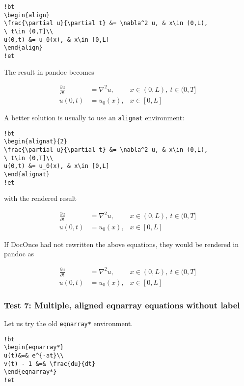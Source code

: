 \documentclass[]{article}
\begin{document}
\begin{verbatim}
!bt
\begin{align}
\frac{\partial u}{\partial t} &= \nabla^2 u, & x\in (0,L),
\ t\in (0,T]\\ 
u(0,t) &= u_0(x), & x\in [0,L]
\end{align}
!et
\end{verbatim}

The result in pandoc becomes

\[
\begin{align}
\frac{\partial u}{\partial t} &= \nabla^2 u, & x\in (0,L),
\ t\in (0,T]\\ 
u(0,t) &= u_0(x), & x\in [0,L]
\end{align}
\]

A better solution is usually to use an \texttt{alignat} environment:

\begin{verbatim}
!bt
\begin{alignat}{2}
\frac{\partial u}{\partial t} &= \nabla^2 u, & x\in (0,L),
\ t\in (0,T]\\ 
u(0,t) &= u_0(x), & x\in [0,L]
\end{alignat}
!et
\end{verbatim}

with the rendered result

\[
\begin{alignat}{2}
\frac{\partial u}{\partial t} &= \nabla^2 u, & x\in (0,L),
\ t\in (0,T]\\ 
u(0,t) &= u_0(x), & x\in [0,L]
\end{alignat}
\]

If DocOnce had not rewritten the above equations, they would be rendered
in pandoc as

\[
\begin{alignat}{2}
\frac{\partial u}{\partial t} &= \nabla^2 u, & x\in (0,L),
\ t\in (0,T]\\ 
u(0,t) &= u_0(x), & x\in [0,L]
\end{alignat}
\]

\subsubsection{Test 7: Multiple, aligned eqnarray equations without
label}\label{test-7-multiple-aligned-eqnarray-equations-without-label}

Let us try the old \texttt{eqnarray*} environment.

\begin{verbatim}
!bt
\begin{eqnarray*}
u(t)&=& e^{-at}\\ 
v(t) - 1 &=& \frac{du}{dt}
\end{eqnarray*}
!et
\end{verbatim}
\end{document}
